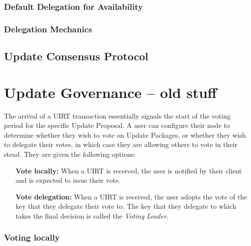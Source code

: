 
\subsubsection{Default Delegation for Availability}
   

\subsubsection{Delegation Mechanics}

\subsection{Update Consensus Protocol}


\section*{Update Governance -- old stuff}
The arrival of a UIRT transaction essentially signals the start of the voting period for the specific Update Proposal. A user can configure their node to determine whether they wish to vote on Update Packages, or whether they wish to delegate their votes, in which case they are allowing others to vote in their stead. They are given the following options:

\begin{itemize}
\item[\textbf{Vote locally:}] When a UIRT is received, the user is notified by their client and is expected to issue their vote.
\item[\textbf{Vote delegation:}] When a UIRT is received, the user adopts the vote of the key that they delegate their vote to. The key that they delegate to which takes the final decision is called the \emph{Voting Leader}.
\end{itemize}

\subsubsection*{Voting locally} 

